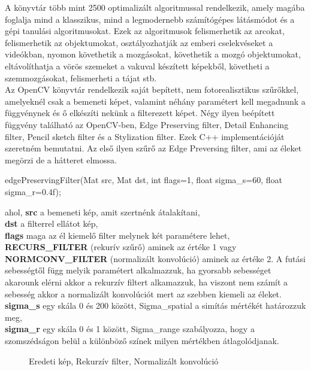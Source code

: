\noindent A könyvtár több mint 2500 optimalizált algoritmussal rendelkezik, amely magába foglalja mind a klasszikus, mind a legmodernebb számítógépes látásmódot és a gépi tanulási algoritmusokat. Ezek az algoritmusok felismerhetik az arcokat, felismerhetik az objektumokat, osztályozhatják az emberi cselekvéseket a videókban, nyomon követhetik a mozgásokat, követhetik a mozgó objektumokat, eltávolíthatja a vörös szemeket a vakuval készített képekből, követheti a szemmozgásokat, felismerheti a tájat stb. 
\\
Az OpenCV könyvtár rendelkezik saját bepített, nem fotorealisztikus szűrőkkel, amelyeknél csak a bemeneti képet, valamint néhány paramétert kell megadnunk a függvénynek és ő elkészíti nekünk a filterezett képet. Négy ilyen beépített függvény található az OpenCV-ben, Edge Preserving filter, Detail Enhancing filter, Pencil sketch filter és a Stylization filter. Ezek C++ implementációját szeretném bemutatni.
Az első ilyen szűrő az Edge Preversing filter, ami az éleket megörzi de a hátteret elmossa. 
\begin{cpp}
edgePreservingFilter(Mat src, Mat dst, int flags=1, 
			float sigma_s=60, float sigma_r=0.4f);
\end{cpp}
ahol, \textbf{src} a bemeneti kép, amit szertnénk átalakítani,\\
\indent \textbf{dst} a filterrel ellátot kép, \\
\indent \textbf{flags} maga az él kiemelő filter melynek két paramétere lehet, \textbf{RECURS\_FILTER} (rekurív szűrő) aminek az értéke 1 vagy \textbf{NORMCONV\_FILTER} (normalizált konvolúció) aminek az értéke 2.  A futási sebességtől függ melyik paramétert alkalmazzuk, ha gyorsabb sebességet akarounk elérni akkor a rekurzív filtert alkamazzuk, ha viszont nem számít a sebesség akkor a  normalizált konvolúciót mert az szebben kiemeli az éleket.\\
\indent \textbf{sigma\_s} egy skála 0 és 200 között, Sigma\_spatial a simítás mértékét határozzuk meg, \\
\indent \textbf{sigma\_r} egy skála 0 és 1 között, Sigma\_range szabályozza, hogy a szomszédságon belül a különböző színek milyen mértékben átlagolódjanak.
\begin{figure}[ht]
\centering
{}
\caption{Eredeti kép, Rekurzív filter, Normalizált konvolúció} 
\label{fig: edgePreservingFilter}
\end{figure}
